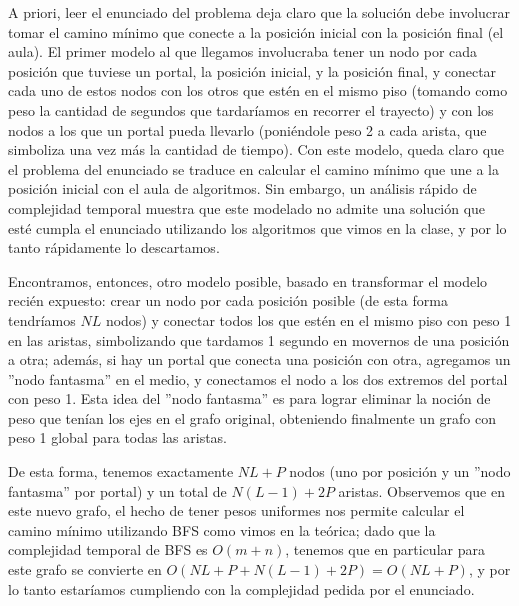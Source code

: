 \documentclass{article}
\theoremstyle{definition}
\theoremstyle{remark}
\begin{document}
A priori, leer el enunciado del problema deja claro que la solución debe involucrar tomar el camino mínimo que conecte a la posición inicial con la posición final (el aula). El primer modelo al que llegamos involucraba tener un nodo por cada posición que tuviese un portal, la posición inicial, y la posición final, y conectar cada uno de estos nodos con los otros que estén en el mismo piso (tomando como peso la cantidad de segundos que tardaríamos en recorrer el trayecto) y con los nodos a los que un portal pueda llevarlo (poniéndole peso 2 a cada arista, que simboliza una vez más la cantidad de tiempo). Con este modelo, queda claro que el problema del enunciado se traduce en calcular el camino mínimo que une a la posición inicial con el aula de algoritmos. Sin embargo, un análisis rápido de complejidad temporal muestra que este modelado no admite una solución que esté cumpla el enunciado utilizando los algoritmos que vimos en la clase, y por lo tanto rápidamente lo descartamos.

Encontramos, entonces, otro modelo posible, basado en transformar el modelo recién expuesto: crear un nodo por cada posición posible (de esta forma tendríamos $NL$ nodos) y conectar todos los que estén en el mismo piso con peso 1 en las aristas, simbolizando que tardamos 1 segundo en movernos de una posición a otra; además, si hay un portal que conecta una posición con otra, agregamos un ''nodo fantasma'' en el medio, y conectamos el nodo a los dos extremos del portal con peso 1. Esta idea del ''nodo fantasma'' es para lograr eliminar la noción de peso que tenían los ejes en el grafo original, obteniendo finalmente un grafo con peso 1 global para todas las aristas.\par

De esta forma, tenemos exactamente $NL + P$ nodos (uno por posición y un ''nodo fantasma'' por portal) y un total de $N (L-1) + 2P$ aristas. Observemos que en este nuevo grafo, el hecho de tener pesos uniformes nos permite calcular el camino mínimo utilizando BFS como vimos en la teórica; dado que la complejidad temporal de BFS es $O(m + n)$, tenemos que en particular para este grafo se convierte en $O(NL + P + N (L-1) + 2P) = O(NL + P)$, y por lo tanto estaríamos cumpliendo con la complejidad pedida por el enunciado.
\end{document}
